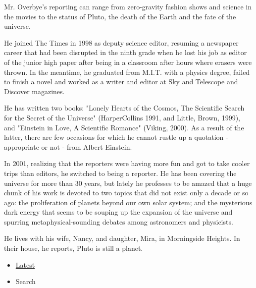 Mr. Overbye's reporting can range from zero-gravity fashion shows and
science in the movies to the status of Pluto, the death of the Earth and
the fate of the universe.

He joined The Times in 1998 as deputy science editor, resuming a
newspaper career that had been disrupted in the ninth grade when he lost
his job as editor of the junior high paper after being in a classroom
after hours where erasers were thrown. In the meantime, he graduated
from M.I.T. with a physics degree, failed to finish a novel and worked
as a writer and editor at Sky and Telescope and Discover magazines.

He has written two books: "Lonely Hearts of the Cosmos, The Scientific
Search for the Secret of the Universe" (HarperCollins 1991, and Little,
Brown, 1999), and "Einstein in Love, A Scientific Romance" (Viking,
2000). As a result of the latter, there are few occasions for which he
cannot rustle up a quotation - appropriate or not - from Albert
Einstein.

In 2001, realizing that the reporters were having more fun and got to
take cooler trips than editors, he switched to being a reporter. He has
been covering the universe for more than 30 years, but lately he
professes to be amazed that a huge chunk of his work is devoted to two
topics that did not exist only a decade or so ago: the proliferation of
planets beyond our own solar system; and the mysterious dark energy that
seems to be souping up the expansion of the universe and spurring
metaphysical-sounding debates among astronomers and physicists.

He lives with his wife, Nancy, and daughter, Mira, in Morningside
Heights. In their house, he reports, Pluto is still a planet.

\begin{itemize}
\tightlist
\item
  \protect\hyperlink{stream-panel}{Latest}
\item
  Search
\end{itemize}

